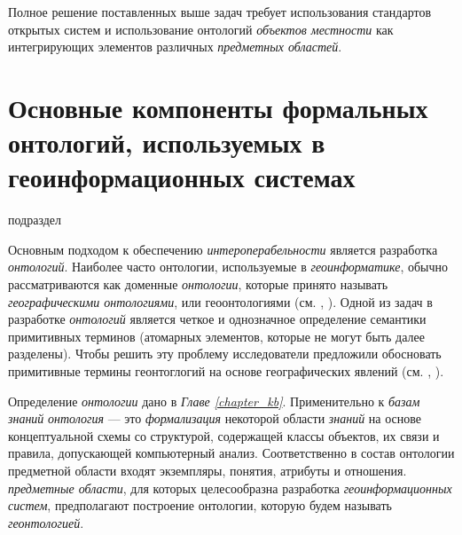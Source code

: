 Полное решение поставленных выше задач требует использования стандартов открытых систем и использование онтологий \textit{объектов местности} как интегрирующих элементов различных \textit{предметных областей}.

\section{Основные компоненты формальных онтологий, используемых в геоинформационных системах}
\label{chapter_gis_sec_components}

\begin{SCn}	
\begin{scnrelfromlist}{подраздел}
\end{scnrelfromlist}
\end{SCn}

Основным подходом к обеспечению \textit{интероперабельности} является разработка \textit{онтологий}. Наиболее часто онтологии, используемые в \textit{геоинформатике}, обычно рассматриваются как доменные \textit{онтологии}, которые принято называть \textit{географическими онтологиями}, или геоонтологиями (см. , ). Одной из задач в разработке \textit{онтологий} является четкое и однозначное определение семантики примитивных терминов (атомарных элементов, которые не могут быть далее разделены). Чтобы решить эту проблему исследователи предложили обосновать примитивные термины геонтоглогий на основе географических явлений (см. , ).

Определение \textit{онтологии} дано в \textit{Главе \ref{chapter_kb}}. Применительно к \textit{базам знаний} \textit{онтология} --- это \textit{формализация} некоторой области \textit{знаний} на основе концептуальной схемы со структурой, содержащей классы объектов, их связи и правила, допускающей компьютерный анализ. Соответственно в состав онтологии предметной области входят экземпляры, понятия, атрибуты и отношения.
\textit{предметные области}, для которых целесообразна разработка \textit{геоинформационных систем}, предполагают построение онтологии, которую будем называть \textit{геонтологией}.

\begin{SCn}
\end{SCn}

